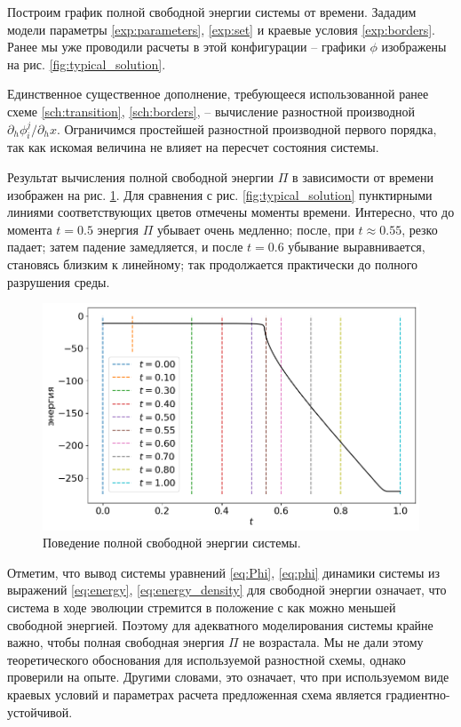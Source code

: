 Построим график полной свободной энергии системы от времени. Зададим модели параметры \eqref{exp:parameters}, \eqref{exp:set} и краевые условия \eqref{exp:borders}. Ранее мы уже проводили расчеты в этой конфигурации -- графики $\phi$ изображены на рис. \ref{fig:typical_solution}.

Единственное существенное дополнение, требующееся использованной ранее схеме \eqref{sch:transition}, \eqref{sch:borders}, -- вычисление разностной производной $\partial_h \phi_i^j / \partial_h x$. Ограничимся простейшей разностной производной первого порядка, так как искомая величина не влияет на пересчет состояния системы.

Результат вычисления полной свободной энергии $\Pi$ в зависимости от времени изображен на рис. \ref{fig:energy}. Для сравнения с рис. \ref{fig:typical_solution} пунктирными линиями соответствующих цветов отмечены моменты времени. Интересно, что до момента $t = 0.5$ энергия $\Pi$ убывает очень медленно; после, при $t \approx 0.55$, резко падает; затем падение замедляется, и после $t = 0.6$ убывание выравнивается, становясь близким к линейному; так продолжается практически до полного разрушения среды.

\begin{figure}
	\centering
	\includegraphics[width=\textwidth]{figures/energy_total.png}
	\vspace{-0.6cm}
	\caption{Поведение полной свободной энергии системы.}
	\label{fig:energy}
\end{figure}

Отметим, что вывод системы уравнений \eqref{eq:Phi}, \eqref{eq:phi} динамики системы из выражений \eqref{eq:energy}, \eqref{eq:energy_density} для свободной энергии означает, что система в ходе эволюции стремится в положение с как можно меньшей свободной энергией. Поэтому для адекватного моделирования системы крайне важно, чтобы полная свободная энергия $\Pi$ не возрастала. Мы не дали этому теоретического обоснования для используемой разностной схемы, однако проверили на опыте. Другими словами, это означает, что при используемом виде краевых условий и параметрах расчета предложенная схема является градиентно-устойчивой.